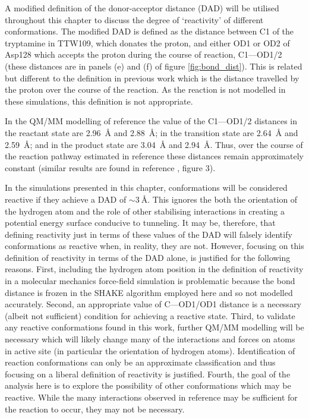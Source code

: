 A modified definition of the donor-acceptor distance (DAD) will be utilised throughout this chapter to discuss the degree of `reactivity' of different conformations. The modified DAD is defined as the distance between C1 of the tryptamine in TTW109, which  donates the proton,  and either OD1 or OD2 of Asp128 which accepts the proton during the course of reaction, C1---OD1/2 (these distances are in panels (e) and (f) of figure \ref{fig:bond_dist}). This is related but different to the definition in previous work \cite{johannissenProtonTunnelingAromatic2007} which is the distance travelled by the proton over the course of the reaction.  As the reaction is not modelled in these simulations, this definition is not appropriate. 


In the QM/MM modelling of reference \cite{ranaghanInitioQMMM2017} the value of the C1---OD1/2 distances in the reactant state are \SI{2.96}{\angstrom} and \SI{2.88}{\angstrom}; in the transition state are \SI{2.64}{\angstrom} and \SI{2.59}{\angstrom}; and in the product state are \SI{3.04}{\angstrom} and \SI{2.94}{\angstrom}. Thus, over the course of the reaction pathway estimated in reference \cite{ranaghanInitioQMMM2017} these distances remain approximately constant (similar results are found in reference \cite{masgrauAtomicDescriptionEnzyme2006}, figure 3).  

In the simulations presented in this chapter, conformations will be considered reactive if they achieve a DAD of $\sim \SI{3}{\angstrom}$. This ignores the both the orientation of the hydrogen atom and the role of other stabilising interactions in creating a potential energy surface conducive to tunneling. It may be, therefore, that defining reactivity just in terms of these values of the DAD will falsely identify conformations as reactive when, in reality, they are not.  However, focusing on this definition of reactivity in terms of the DAD alone, is justified for the following reasons. First, including the hydrogen atom position in the definition of reactivity in a molecular mechanics force-field simulation is problematic because the bond distance is frozen in the SHAKE algorithm employed here and so not modelled accurately. Second, an appropriate value of C---OD1/OD1 distance is a necessary (albeit not sufficient) condition for achieving a reactive state. Third, to validate any reactive conformations found in this work, further QM/MM modelling will be necessary which will likely change many of the interactions and forces on atoms in active site (in particular the orientation of hydrogen atoms). Identification of reaction conformations can only be an approximate classification and thus focusing on a liberal definition of reactivity is justified.  Fourth, the goal of the analysis here is to explore the possibility of other conformations which may be reactive. While the many interactions observed in reference \cite{ranaghanInitioQMMM2017} may be sufficient for the reaction to occur, they may not be necessary.

